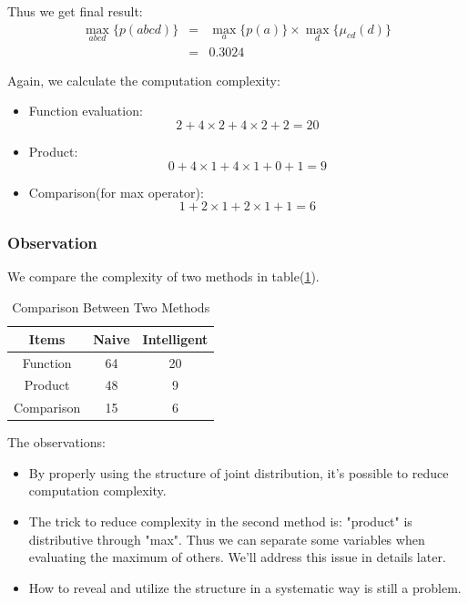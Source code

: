 Thus we get final result:
\begin{eqnarray}
\max_{abcd} \{ p(abcd) \} &=& \max_{a} \{ p(a) \} \times \max_{d}\{\mu_{cd}(d)\} \\
&=& 0.3024 
\end{eqnarray}

Again, we calculate the computation complexity:
\begin{itemize}
	\item Function evaluation: 
	$$
	2 + 4 \times 2 + 4 \times 2 + 2 = 20
	$$
	\item Product: 
	$$
	0 + 4 \times 1 + 4 \times 1 + 0 + 1 = 9
	$$
	\item Comparison(for max operator): 
	$$
	1 + 2 \times 1 + 2 \times 1 + 1 = 6
	$$
\end{itemize}

\subsubsection{Observation}


We compare the complexity of two methods in table(\ref{tbl:toy_cmp}). 

\begin{table}[htb]
\centering
	\caption{Comparison Between Two Methods}
	\label{tbl:toy_cmp}
	\begin{tabular}{c|cc}
	\hline
	Items & Naive & Intelligent \\
	\hline
	Function & 64 & 20 \\
	Product & 48 & 9 \\
	Comparison & 15 & 6 \\
	\hline
	\end{tabular}
\end{table}

The observations:
\begin{itemize}
	\item By properly using the structure of joint distribution, 
	it's possible to reduce computation complexity.
	\item The trick to reduce complexity in the second method is:
	"product" is distributive through "max". Thus we can 
	separate some variables when evaluating the maximum of 
	others. We'll address this issue in details later.   
	\item How to reveal and utilize the structure in a 
	systematic way is still a problem. 
\end{itemize}

